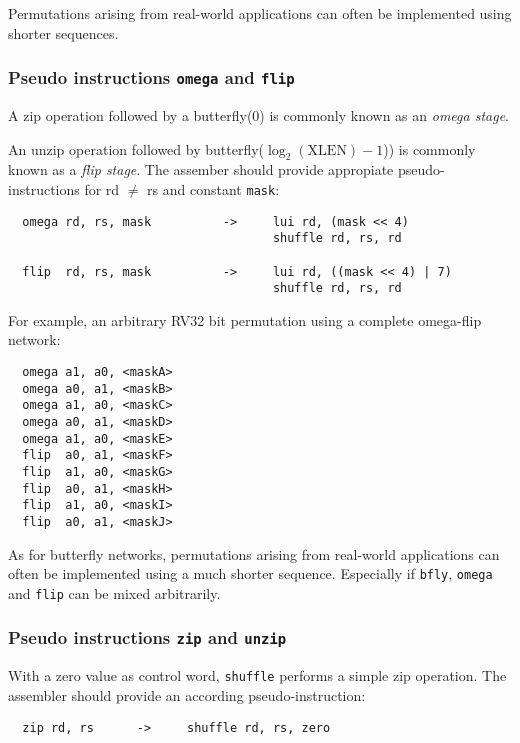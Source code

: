 Permutations arising from real-world applications can often be implemented using
shorter sequences.

\subsubsection{Pseudo instructions {\tt omega} and {\tt flip}}

A zip operation followed by a butterfly(0) is commonly known as an {\it omega stage}.

An unzip operation followed by butterfly($\log_2(\textrm{XLEN})-1$)) is
commonly known as a {\it flip stage}. The assember should provide appropiate
pseudo-instructions for rd $\neq$ rs and constant {\tt mask}:

\begin{verbatim}
  omega rd, rs, mask          ->     lui rd, (mask << 4)
                                     shuffle rd, rs, rd

  flip  rd, rs, mask          ->     lui rd, ((mask << 4) | 7)
                                     shuffle rd, rs, rd
\end{verbatim}

For example, an arbitrary RV32 bit permutation using a complete omega-flip network:

\begin{verbatim}
  omega a1, a0, <maskA>
  omega a0, a1, <maskB>
  omega a1, a0, <maskC>
  omega a0, a1, <maskD>
  omega a1, a0, <maskE>
  flip  a0, a1, <maskF>
  flip  a1, a0, <maskG>
  flip  a0, a1, <maskH>
  flip  a1, a0, <maskI>
  flip  a0, a1, <maskJ>
\end{verbatim}

As for butterfly networks, permutations arising from real-world applications
can often be implemented using a much shorter sequence. Especially if {\tt bfly},
{\tt omega} and {\tt flip} can be mixed arbitrarily.

\subsubsection{Pseudo instructions {\tt zip} and {\tt unzip}}

With a zero value as control word, {\tt shuffle} performs a simple zip
operation. The assembler should provide an according pseudo-instruction:

\begin{verbatim}
  zip rd, rs      ->     shuffle rd, rs, zero
\end{verbatim}

